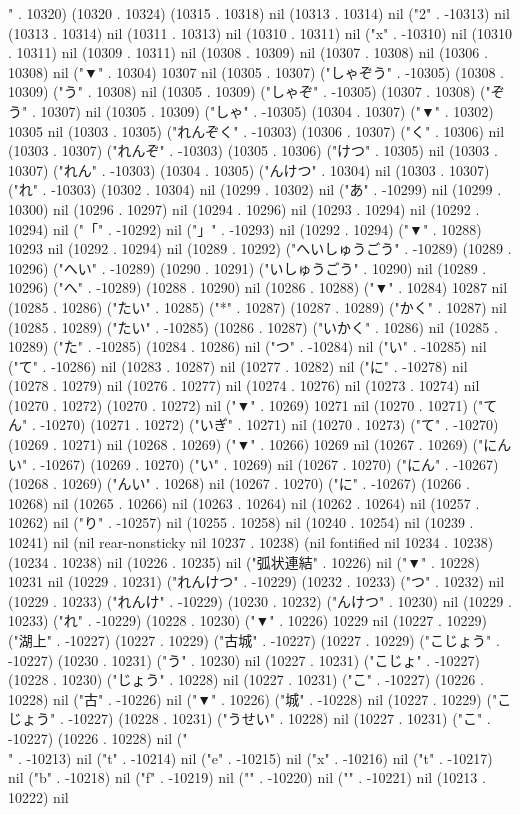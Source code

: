" . 10320) (10320 . 10324) (10315 . 10318) nil (10313 . 10314) nil ("2" . -10313) nil (10313 . 10314) nil (10311 . 10313) nil (10310 . 10311) nil ("x" . -10310) nil (10310 . 10311) nil (10309 . 10311) nil (10308 . 10309) nil (10307 . 10308) nil (10306 . 10308) nil ("▼" . 10304) 10307 nil (10305 . 10307) ("しゃぞう" . -10305) (10308 . 10309) ("う" . 10308) nil (10305 . 10309) ("しゃぞ" . -10305) (10307 . 10308) ("ぞう" . 10307) nil (10305 . 10309) ("しゃ" . -10305) (10304 . 10307) ("▼" . 10302) 10305 nil (10303 . 10305) ("れんぞく" . -10303) (10306 . 10307) ("く" . 10306) nil (10303 . 10307) ("れんぞ" . -10303) (10305 . 10306) ("けつ" . 10305) nil (10303 . 10307) ("れん" . -10303) (10304 . 10305) ("んけつ" . 10304) nil (10303 . 10307) ("れ" . -10303) (10302 . 10304) nil (10299 . 10302) nil ("あ" . -10299) nil (10299 . 10300) nil (10296 . 10297) nil (10294 . 10296) nil (10293 . 10294) nil (10292 . 10294) nil ("「" . -10292) nil ("」" . -10293) nil (10292 . 10294) ("▼" . 10288) 10293 nil (10292 . 10294) nil (10289 . 10292) ("へいしゅうごう" . -10289) (10289 . 10296) ("へい" . -10289) (10290 . 10291) ("いしゅうごう" . 10290) nil (10289 . 10296) ("へ" . -10289) (10288 . 10290) nil (10286 . 10288) ("▼" . 10284) 10287 nil (10285 . 10286) ("たい" . 10285) ("*" . 10287) (10287 . 10289) ("かく" . 10287) nil (10285 . 10289) ("たい" . -10285) (10286 . 10287) ("いかく" . 10286) nil (10285 . 10289) ("た" . -10285) (10284 . 10286) nil ("つ" . -10284) nil ("い" . -10285) nil ("て" . -10286) nil (10283 . 10287) nil (10277 . 10282) nil ("に" . -10278) nil (10278 . 10279) nil (10276 . 10277) nil (10274 . 10276) nil (10273 . 10274) nil (10270 . 10272) (10270 . 10272) nil ("▼" . 10269) 10271 nil (10270 . 10271) ("てん" . -10270) (10271 . 10272) ("いぎ" . 10271) nil (10270 . 10273) ("て" . -10270) (10269 . 10271) nil (10268 . 10269) ("▼" . 10266) 10269 nil (10267 . 10269) ("にんい" . -10267) (10269 . 10270) ("い" . 10269) nil (10267 . 10270) ("にん" . -10267) (10268 . 10269) ("んい" . 10268) nil (10267 . 10270) ("に" . -10267) (10266 . 10268) nil (10265 . 10266) nil (10263 . 10264) nil (10262 . 10264) nil (10257 . 10262) nil ("り" . -10257) nil (10255 . 10258) nil (10240 . 10254) nil (10239 . 10241) nil (nil rear-nonsticky nil 10237 . 10238) (nil fontified nil 10234 . 10238) (10234 . 10238) nil (10226 . 10235) nil ("弧状連結" . 10226) nil ("▼" . 10228) 10231 nil (10229 . 10231) ("れんけつ" . -10229) (10232 . 10233) ("つ" . 10232) nil (10229 . 10233) ("れんけ" . -10229) (10230 . 10232) ("んけつ" . 10230) nil (10229 . 10233) ("れ" . -10229) (10228 . 10230) ("▼" . 10226) 10229 nil (10227 . 10229) ("湖上" . -10227) (10227 . 10229) ("古城" . -10227) (10227 . 10229) ("こじょう" . -10227) (10230 . 10231) ("う" . 10230) nil (10227 . 10231) ("こじょ" . -10227) (10228 . 10230) ("じょう" . 10228) nil (10227 . 10231) ("こ" . -10227) (10226 . 10228) nil ("古" . -10226) nil ("▼" . 10226) ("城" . -10228) nil (10227 . 10229) ("こじょう" . -10227) (10228 . 10231) ("うせい" . 10228) nil (10227 . 10231) ("こ" . -10227) (10226 . 10228) nil ("\\" . -10213) nil ("t" . -10214) nil ("e" . -10215) nil ("x" . -10216) nil ("t" . -10217) nil ("b" . -10218) nil ("f" . -10219) nil ("{" . -10220) nil ("}" . -10221) nil (10213 . 10222) nil 